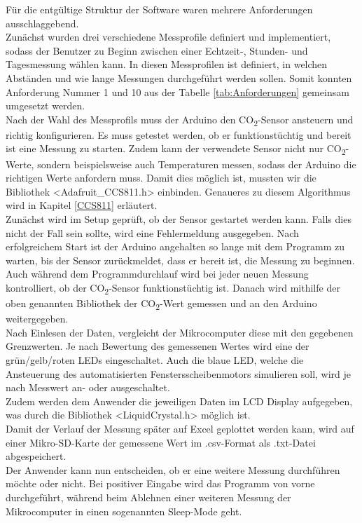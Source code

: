 \label{Softwaremplementation}



Für die entgültige Struktur der Software waren mehrere Anforderungen ausschlaggebend. \\
Zunächst wurden drei verschiedene Messprofile definiert und implementiert, sodass der Benutzer zu Beginn zwischen einer Echtzeit-, Stunden- und Tagesmessung wählen kann. In diesen Messprofilen ist definiert, in welchen Abständen und wie lange Messungen durchgeführt werden sollen. Somit konnten Anforderung Nummer 1 und 10 aus der Tabelle \ref{tab:Anforderungen} gemeinsam umgesetzt werden. \\
Nach der Wahl des Messprofils muss der Arduino den CO\textsubscript{2}-Sensor ansteuern und richtig konfigurieren. Es muss getestet werden, ob er funktionstüchtig und bereit ist eine Messung zu starten. Zudem kann der verwendete Sensor nicht nur CO\textsubscript{2}-Werte, sondern beispielsweise auch Temperaturen messen, sodass der Arduino die richtigen Werte anfordern muss. Damit dies möglich ist, mussten wir die Bibliothek <Adafruit\_CCS811.h> einbinden. Genaueres zu diesem Algorithmus wird in Kapitel \ref{CCS811} erläutert. \\
Zunächst wird im Setup geprüft, ob der Sensor gestartet werden kann. Falls dies nicht der Fall sein sollte, wird eine Fehlermeldung ausgegeben. Nach erfolgreichem Start ist der Arduino angehalten so lange mit dem Programm zu warten, bis der Sensor zurückmeldet, dass er bereit ist, die Messung zu beginnen. \\
Auch während dem Programmdurchlauf wird bei jeder neuen Messung kontrolliert, ob der CO\textsubscript{2}-Sensor funktionstüchtig ist. Danach wird mithilfe der oben genannten Bibliothek der CO\textsubscript{2}-Wert gemessen und an den Arduino weitergegeben. \\
Nach Einlesen der Daten, vergleicht der Mikrocomputer diese mit den gegebenen Grenzwerten. Je nach Bewertung des gemessenen Wertes wird eine der grün/gelb/roten \ac{LED}s eingeschaltet. Auch die blaue \ac{LED}, welche die Ansteuerung des automatisierten Fenstersscheibenmotors simulieren soll, wird je nach Messwert an- oder ausgeschaltet. \\
Zudem werden dem Anwender die jeweiligen Daten im \ac{LCD} Display aufgegeben, was durch die Bibliothek <LiquidCrystal.h> möglich ist. \\
Damit der Verlauf der Messung später auf Excel geplottet werden kann, wird auf einer Mikro-SD-Karte der gemessene Wert im .csv-Format als .txt-Datei abgespeichert. \\ %
Der Anwender kann nun entscheiden, ob er eine weitere Messung durchführen möchte oder nicht. Bei positiver Eingabe wird das Programm von vorne durchgeführt, während beim Ablehnen einer weiteren Messung der Mikrocomputer in einen sogenannten Sleep-Mode geht. %



